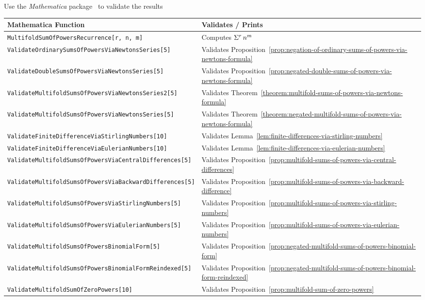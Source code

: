 Use the \textit{Mathematica} package~\cite{MathematicaPrograms} to validate the results
\begin{center}
  \renewcommand{\arraystretch}{1.3}
  \begin{tabular}{ll}
    \toprule
    \textbf{Mathematica Function}                                   & \textbf{Validates / Prints}                                                         \\
    \midrule
    \texttt{MultifoldSumOfPowersRecurrence[r, n, m]}                & Computes $\Sigma^{r}\,{n}^{m}$                                                  \\
    \texttt{ValidateOrdinarySumsOfPowersViaNewtonsSeries[5]}        & Validates Proposition~\eqref{prop:negation-of-ordinary-sums-of-powers-via-newtons-formula}       \\
    \texttt{ValidateDoubleSumsOfPowersViaNewtonsSeries[5]}          & Validates Proposition~\eqref{prop:negated-double-sums-of-powers-via-newtons-formula}       \\
    \texttt{ValidateMultifoldSumsOfPowersViaNewtonsSeries2[5]}      & Validates Theorem~\eqref{theorem:multifold-sums-of-powers-via-newtons-formula}       \\
    \texttt{ValidateMultifoldSumsOfPowersViaNewtonsSeries[5]}       & Validates Theorem~\eqref{theorem:negated-multifold-sums-of-powers-via-newtons-formula}       \\
    \texttt{ValidateFiniteDifferenceViaStirlingNumbers[10]}         & Validates Lemma~\eqref{lem:finite-differences-via-stirling-numbers}                 \\
    \texttt{ValidateFiniteDifferenceViaEulerianNumbers[10]}         & Validates Lemma~\eqref{lem:finite-differences-via-eulerian-numbers}                 \\
    \texttt{ValidateMultifoldSumsOfPowersViaCentralDifferences[5]}  & Validates Proposition~\eqref{prop:multifold-sums-of-powers-via-central-differences} \\
    \texttt{ValidateMultifoldSumsOfPowersViaBackwardDifferences[5]} & Validates Proposition~\eqref{prop:multifold-sums-of-powers-via-backward-difference} \\
    \texttt{ValidateMultifoldSumsOfPowersViaStirlingNumbers[5]}     & Validates Proposition~\eqref{prop:multifold-sums-of-powers-via-stirling-numbers}    \\
    \texttt{ValidateMultifoldSumsOfPowersViaEulerianNumbers[5]}     & Validates Proposition~\eqref{prop:multifold-sums-of-powers-via-eulerian-numbers}    \\
    \texttt{ValidateMultifoldSumsOfPowersBinomialForm[5]}           & Validates Proposition~\eqref{prop:negated-multifold-sums-of-powers-binomial-form}           \\
    \texttt{ValidateMultifoldSumsOfPowersBinomialFormReindexed[5]}  & Validates Proposition~\eqref{prop:negated-multifold-sums-of-powers-binomial-form-reindexed} \\
    \texttt{ValidateMultifoldSumOfZeroPowers[10]}                   & Validates Proposition~\eqref{prop:multifold-sum-of-zero-powers} \\
    \bottomrule
  \end{tabular}
\end{center}
